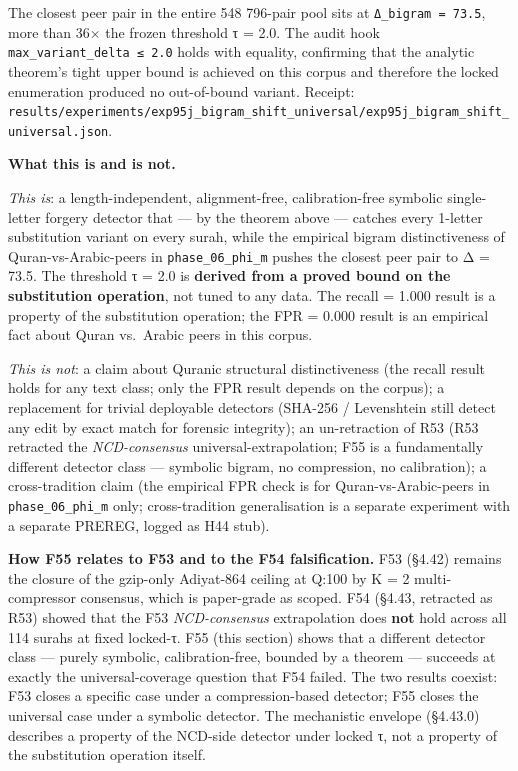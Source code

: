\documentclass[
]{article}
\begin{document}
The closest peer pair in the entire 548 796-pair pool sits at
\texttt{Δ\_bigram\ =\ 73.5}, more than 36× the frozen threshold τ = 2.0.
The audit hook \texttt{max\_variant\_delta\ ≤\ 2.0} holds with equality,
confirming that the analytic theorem's tight upper bound is achieved on
this corpus and therefore the locked enumeration produced no
out-of-bound variant. Receipt:
\texttt{results/experiments/exp95j\_bigram\_shift\_universal/exp95j\_bigram\_shift\_universal.json}.

\textbf{What this is and is not.}

\emph{This is}: a length-independent, alignment-free, calibration-free
symbolic single-letter forgery detector that --- by the theorem above
--- catches every 1-letter substitution variant on every surah, while
the empirical bigram distinctiveness of Quran-vs-Arabic-peers in
\texttt{phase\_06\_phi\_m} pushes the closest peer pair to Δ = 73.5. The
threshold τ = 2.0 is \textbf{derived from a proved bound on the
substitution operation}, not tuned to any data. The recall = 1.000
result is a property of the substitution operation; the FPR = 0.000
result is an empirical fact about Quran vs.~Arabic peers in this corpus.

\emph{This is not}: a claim about Quranic structural distinctiveness
(the recall result holds for any text class; only the FPR result depends
on the corpus); a replacement for trivial deployable detectors (SHA-256
/ Levenshtein still detect any edit by exact match for forensic
integrity); an un-retraction of R53 (R53 retracted the
\emph{NCD-consensus} universal-extrapolation; F55 is a fundamentally
different detector class --- symbolic bigram, no compression, no
calibration); a cross-tradition claim (the empirical FPR check is for
Quran-vs-Arabic-peers in \texttt{phase\_06\_phi\_m} only;
cross-tradition generalisation is a separate experiment with a separate
PREREG, logged as H44 stub).

\textbf{How F55 relates to F53 and to the F54 falsification.} F53
(§4.42) remains the closure of the gzip-only Adiyat-864 ceiling at Q:100
by K = 2 multi-compressor consensus, which is paper-grade as scoped. F54
(§4.43, retracted as R53) showed that the F53 \emph{NCD-consensus}
extrapolation does \textbf{not} hold across all 114 surahs at fixed
locked-τ. F55 (this section) shows that a different detector class ---
purely symbolic, calibration-free, bounded by a theorem --- succeeds at
exactly the universal-coverage question that F54 failed. The two results
coexist: F53 closes a specific case under a compression-based detector;
F55 closes the universal case under a symbolic detector. The mechanistic
envelope (§4.43.0) describes a property of the NCD-side detector under
locked τ, not a property of the substitution operation itself.
\end{document}
